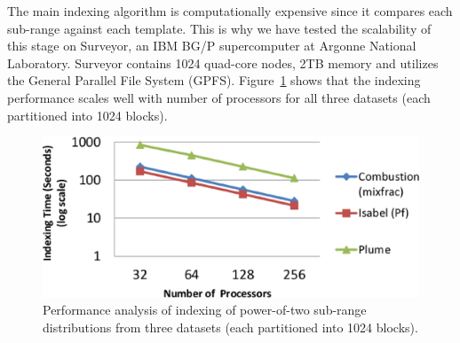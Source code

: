 The main indexing algorithm is computationally expensive since it compares each sub-range against each template. This is why we have tested the scalability of this stage on Surveyor, an IBM BG/P supercomputer at Argonne National Laboratory. Surveyor contains 1024 quad-core nodes, 2TB memory and utilizes the General Parallel File System (GPFS). Figure~\ref{fig:perf_encoding} shows that the indexing performance scales well with number of processors for all three datasets (each partitioned into 1024 blocks).
\begin{figure}[!htb]
\centering
	\includegraphics[width = 0.8\linewidth, keepaspectratio = true]{images/eps/perf_encoding.eps}
	\caption{Performance analysis of indexing of power-of-two sub-range distributions from three datasets (each partitioned into 1024 blocks).}	
	\label{fig:perf_encoding}
	\vspace{-0.15in}
\end{figure}
%
